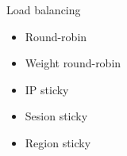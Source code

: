 \begin{frame}{Load balancing}
  \begin{center}
    \begin{itemize}
      \item Round-robin
      \item Weight round-robin
      \item IP sticky
      \item Sesion sticky
      \item Region sticky
    \end{itemize}
  \end{center}
\end{frame}
